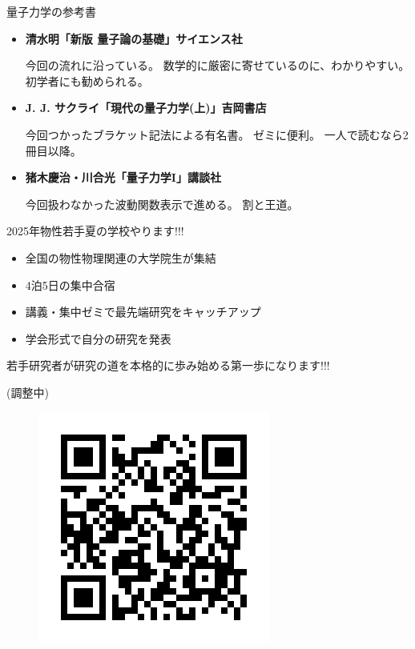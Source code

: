 \documentclass[dvipdfm]{beamer}
\begin{document}
\begin{frame}{量子力学の参考書}
    \begin{itemize}
        \item \textbf{清水明「新版 量子論の基礎」サイエンス社}

        今回の流れに沿っている。
        数学的に厳密に寄せているのに、わかりやすい。
        初学者にも勧められる。
        \item \textbf{J. J. サクライ「現代の量子力学(上)」吉岡書店}

        今回つかったブラケット記法による有名書。
        ゼミに便利。
        一人で読むなら2冊目以降。
        \item \textbf{猪木慶治・川合光「量子力学I」講談社}

        今回扱わなかった波動関数表示で進める。
        割と王道。
    \end{itemize}
\end{frame}

\begin{frame}{2025年物性若手夏の学校やります!!!}
    \begin{itemize}
        \item 全国の物性物理関連の大学院生が集結
        \item 4泊5日の集中合宿
        \item 講義・集中ゼミで最先端研究をキャッチアップ
        \item 学会形式で自分の研究を発表
    \end{itemize}
    若手研究者が研究の道を本格的に歩み始める第一歩になります!!!

    \textbf{}

    \textbf{}(調整中)
    \begin{figure}
        \centering
        \includegraphics[width=0.3\linewidth]{QR_736654.png}
    \end{figure}
\end{frame}
\end{document}
